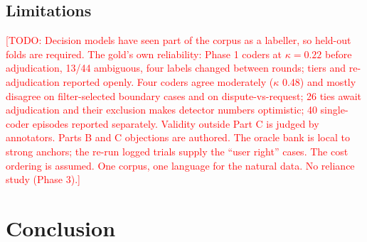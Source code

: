 \documentclass[preprint,12pt,3p,times]{elsarticle}
\newcommand{\todo}[1]{\textcolor{red}{[TODO: #1]}}
\begin{document}
\subsection{Limitations}
\todo{Decision models have seen part of the corpus as a labeller, so held-out folds are required. The gold's own reliability: Phase 1 coders at $\kappa=0.22$ before adjudication, 13/44 ambiguous, four labels changed between rounds; tiers and re-adjudication reported openly. Four coders agree moderately ($\kappa$ 0.48) and mostly disagree on filter-selected boundary cases and on dispute-vs-request; 26 ties await adjudication and their exclusion makes detector numbers optimistic; 40 single-coder episodes reported separately. Validity outside Part C is judged by annotators. Parts B and C objections are authored. The oracle bank is local to strong anchors; the re-run logged trials supply the ``user right'' cases. The cost ordering is assumed. One corpus, one language for the natural data. No reliance study (Phase 3).}

\section{Conclusion}



\end{document}
